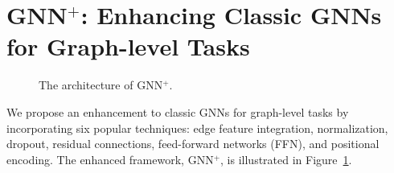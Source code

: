 

\section{GNN$^{+}$: Enhancing Classic GNNs for Graph-level Tasks} \label{sec3}

\begin{figure}[t]     \vspace{-0.1 in}  \caption{\label{1} 
The architecture of GNN$^{+}$.}  \vspace{-0.1 in}
\label{fig:architecture} \end{figure}

We propose an enhancement to classic GNNs for graph-level tasks by incorporating six popular techniques: edge feature integration, normalization, dropout, residual connections, feed-forward networks (FFN), and positional encoding. The enhanced framework, GNN$^{+}$, is illustrated in Figure~\ref{fig:architecture}.



